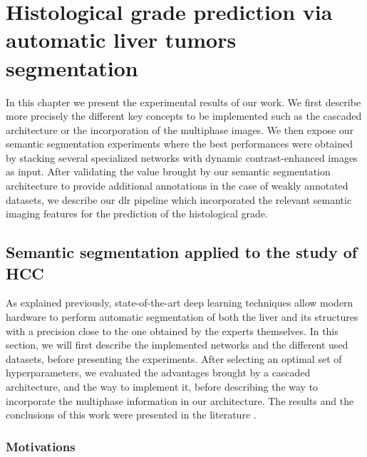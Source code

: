 \chapter{Histological grade prediction via automatic liver tumors segmentation}\label{contributions_xp}


In this chapter we present the experimental results of our work.
We first describe more precisely the different key concepts 
to be implemented such as the cascaded architecture or the 
incorporation of the multiphase images.
We then expose our semantic segmentation experiments where 
the best performances were obtained by stacking several 
specialized networks with dynamic contrast-enhanced images as input.
After validating the value brought by our semantic segmentation architecture
to provide additional annotations in the case of weakly annotated datasets, 
we describe our \ac{dlr} pipeline which incorporated the relevant semantic imaging features 
for the prediction of the histological grade.

\section{Semantic segmentation applied to the study of HCC}

As explained previously, state-of-the-art deep learning techniques allow
modern hardware to perform automatic segmentation of both the liver and
its structures with a precision close to the one obtained by the experts
themselves.
In this section, we will first describe the implemented
networks and the different used datasets, before presenting the experiments.
After selecting an optimal set of hyperparameters, we evaluated the
advantages brought by a cascaded architecture, and the way to implement
it, before describing the way to incorporate the multiphase information
in our architecture.
The results and the conclusions of this work were presented in the
literature \cite{Ouhmich2019}.


\subsection{Motivations}

